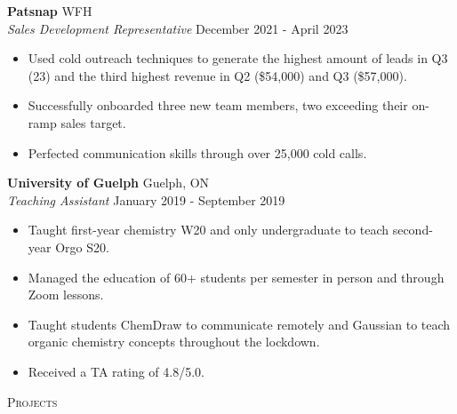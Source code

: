 \documentclass[a4paper]{article}
\newcommand{\lineunder} {
    \vspace*{-8pt} \\
    \hspace*{-18pt} \hrulefill \\
}
\newcommand{\header} [1] {
    {\hspace*{-18pt}\vspace*{6pt} \textsc{#1}}
    \vspace*{-6pt} \lineunder
}
\begin{document}
\textbf{Patsnap} \hfill WFH\\
\textit{Sales Development Representative} \hfill December 2021 - April 2023\\
\vspace{-1mm}
\begin{itemize} \itemsep 1pt
	\item Used cold outreach techniques to generate the highest amount of leads in Q3 (23) and the third highest revenue in Q2 (\$54,000) and Q3 (\$57,000).
	\item Successfully onboarded three new team members, two exceeding their on-ramp sales target.
	\item Perfected communication skills through over 25,000 cold calls.
\end{itemize}

\textbf{University of Guelph} \hfill Guelph, ON\\
\textit{Teaching Assistant} \hfill January 2019 - September 2019\\
\vspace{-1mm}
\begin{itemize} \itemsep 1pt
	\item Taught first-year chemistry W20 and only undergraduate to teach second-year Orgo S20. 
	\item Managed the education of 60+ students per semester in person and through Zoom lessons.
        \item Taught students ChemDraw to communicate remotely and Gaussian to teach organic chemistry concepts throughout the lockdown.
	\item Received a TA rating of 4.8/5.0.
\end{itemize}


\header{Projects}
\end{document}
